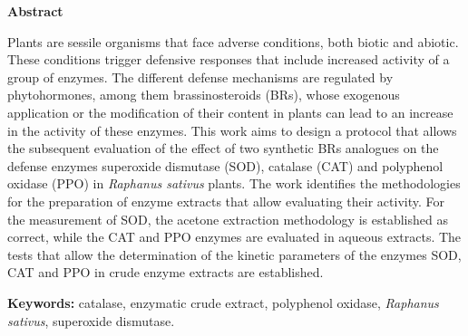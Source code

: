 {\bf \LARGE Abstract}

\medskip
\medskip
\medskip
\medskip
\medskip
\medskip

Plants are sessile organisms that face adverse conditions, both biotic and abiotic. These conditions trigger defensive responses that include increased activity of a group of enzymes. The different defense mechanisms are regulated by phytohormones, among them brassinosteroids (BRs), whose exogenous application or the modification of their content in plants can lead to an increase in the activity of these enzymes. This work aims to design a protocol that allows the subsequent evaluation of the effect of two synthetic BRs analogues on the defense enzymes superoxide dismutase (SOD), catalase (CAT) and polyphenol oxidase (PPO) in \textit{Raphanus sativus} plants. The work identifies the methodologies for the preparation of enzyme extracts that allow evaluating their activity. For the measurement of SOD, the acetone extraction methodology is established as correct, while the CAT and PPO enzymes are evaluated in aqueous extracts. The tests that allow the determination of the kinetic parameters of the enzymes SOD, CAT and PPO in crude enzyme extracts are established.




\medskip
\medskip
\medskip
\medskip
\medskip
\medskip
\medskip
\medskip
\medskip
\medskip
\medskip
\medskip
\medskip 
\medskip

 {\bf Keywords:} catalase, enzymatic crude extract, polyphenol oxidase, \textit{Raphanus sativus}, superoxide dismutase.